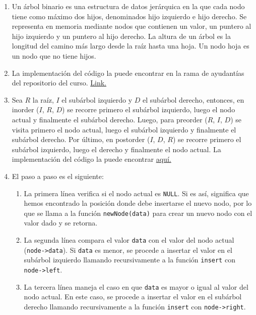 \documentclass[12pt]{article}
\begin{document}
        \begin{enumerate}
            \item Un árbol binario es una estructura de datos jerárquica en la que cada nodo tiene como máximo dos hijos, denominados hijo izquierdo e hijo derecho. Se representa en memoria mediante nodos que contienen un valor, un puntero al hijo izquierdo y un puntero al hijo derecho. La altura de un árbol es la longitud del camino más largo desde la raíz hasta una hoja. Un nodo hoja es un nodo que no tiene hijos.
            
            \item La implementación del código la puede encontrar en la rama de ayudantías del repositorio del curso. \href{https://github.com/otrab/EDA/tree/ayudant%C3%ADas}{Link.}

            \item Sea $R$ la raíz, $I$ el subárbol izquierdo y $D$ el subárbol derecho, entonces, en inorder ($I$, $R$, $D$) se recorre primero el subárbol izquierdo, luego el nodo actual y finalmente el subárbol derecho. Luego, para preorder ($R$, $I$, $D$) se visita primero el nodo actual, luego el subárbol izquierdo y finalmente el subárbol derecho. Por último, en postorder ($I$, $D$, $R$) se recorre primero el subárbol izquierdo, luego el derecho y finalmente el nodo actual. La implementación del código la puede encontrar \href{https://github.com/otrab/EDA/tree/ayudant%C3%ADas}{aquí.}
            
            \item El paso a paso es el siguiente:
            \begin{enumerate}[label=\alph*)]
                \item La primera línea verifica si el nodo actual es \texttt{NULL}. Si es así, significa que hemos encontrado la posición donde debe insertarse el nuevo nodo, por lo que se llama a la función \texttt{newNode(data)} para crear un nuevo nodo con el valor dado y se retorna.
    
                \item La segunda línea compara el valor \texttt{data} con el valor del nodo actual (\texttt{node->data}). Si \texttt{data} es menor, se procede a insertar el valor en el subárbol izquierdo llamando recursivamente a la función \texttt{insert} con \texttt{node->left}.
    
                \item La tercera línea maneja el caso en que \texttt{data} es mayor o igual al valor del nodo actual. En este caso, se procede a insertar el valor en el subárbol derecho llamando recursivamente a la función \texttt{insert} con \texttt{node->right}.
    

\end{enumerate}
\end{enumerate}
\end{document}
